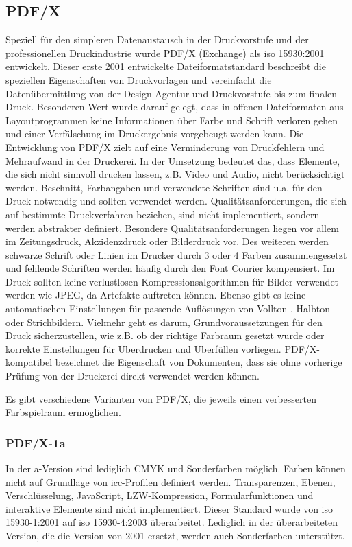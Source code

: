 \subsection{PDF/X}
Speziell für den simpleren Datenaustausch in der Druckvorstufe und der professionellen Druckindustrie wurde PDF/X (Exchange) als \gls{iso} 15930:2001 entwickelt. Dieser erste 2001 entwickelte Dateiformatstandard beschreibt die speziellen Eigenschaften von Druckvorlagen und vereinfacht die Datenübermittlung von der Design-Agentur und Druckvorstufe bis zum finalen Druck. Besonderen Wert wurde darauf gelegt, dass in offenen Dateiformaten aus Layoutprogrammen keine Informationen über Farbe und Schrift verloren gehen und einer Verfälschung im Druckergebnis vorgebeugt werden kann. \cite{adobe-pdf-e} Die Entwicklung von PDF/X zielt auf eine Verminderung von Druckfehlern und Mehraufwand in der Druckerei. In der Umsetzung bedeutet das, dass Elemente, die sich nicht sinnvoll drucken lassen, z.B. Video und Audio, nicht berücksichtigt werden. Beschnitt, Farbangaben und verwendete Schriften sind u.a. für den Druck notwendig und sollten verwendet werden. Qualitätsanforderungen, die sich auf bestimmte Druckverfahren beziehen, sind nicht implementiert, sondern werden abstrakter definiert. Besondere Qualitätsanforderungen liegen vor allem im Zeitungsdruck, Akzidenzdruck oder Bilderdruck vor. Des weiteren werden schwarze Schrift oder Linien im Drucker durch 3 oder 4 Farben zusammengesetzt und fehlende Schriften werden häufig durch den Font Courier kompensiert. Im Druck sollten keine verlustlosen Kompressionsalgorithmen für Bilder verwendet werden wie JPEG, da Artefakte auftreten können. Ebenso gibt es keine automatischen Einstellungen für passende Auflösungen von Vollton-, Halbton- oder Strichbildern. Vielmehr geht es darum, Grundvoraussetzungen für den Druck sicherzustellen, wie z.B. ob der richtige Farbraum gesetzt wurde oder korrekte Einstellungen für Überdrucken und Überfüllen vorliegen. PDF/X-kompatibel bezeichnet die Eigenschaft von Dokumenten, dass sie ohne vorherige Prüfung von der Druckerei direkt verwendet werden können. \cite{adobe-pdf-x}
\par
Es gibt verschiedene Varianten von PDF/X, die jeweils einen verbesserten Farbspielraum ermöglichen. 

\subsubsection{PDF/X-1a}
In der a-Version sind lediglich CMYK und Sonderfarben möglich. Farben können nicht auf Grundlage von \gls{icc}-Profilen definiert werden. Transparenzen, \cite{adobe-pdf-x} Ebenen, Verschlüsselung, JavaScript, LZW-Kompression, Formularfunktionen und interaktive Elemente sind nicht implementiert. Dieser Standard wurde von \gls{iso} 15930-1:2001 auf \gls{iso} 15930-4:2003 überarbeitet. Lediglich in der überarbeiteten Version, die die Version von 2001 ersetzt, werden auch Sonderfarben unterstützt.  \cite{proj-consult}

